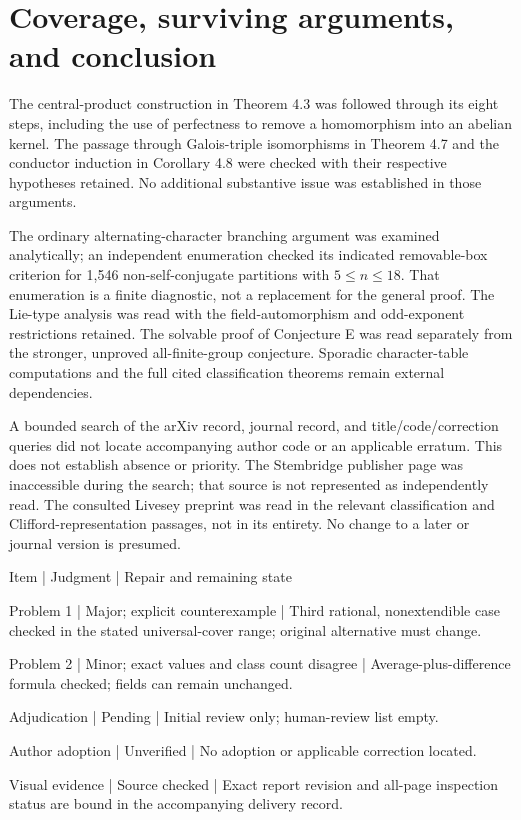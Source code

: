 \documentclass[10pt]{article}
\begin{document}
\section*{Coverage, surviving arguments, and conclusion}
The central-product construction in Theorem 4.3 was followed through its eight steps, including the use of perfectness to remove a homomorphism into an abelian kernel. The passage through Galois-triple isomorphisms in Theorem 4.7 and the conductor induction in Corollary 4.8 were checked with their respective hypotheses retained. No additional substantive issue was established in those arguments.\par
The ordinary alternating-character branching argument was examined analytically; an independent enumeration checked its indicated removable-box criterion for 1,546 non-self-conjugate partitions with \(5\le n\le18\). That enumeration is a finite diagnostic, not a replacement for the general proof. The Lie-type analysis was read with the field-automorphism and odd-exponent restrictions retained. The solvable proof of Conjecture E was read separately from the stronger, unproved all-finite-group conjecture. Sporadic character-table computations and the full cited classification theorems remain external dependencies.\par
A bounded search of the arXiv record, journal record, and title/code/correction queries did not locate accompanying author code or an applicable erratum. This does not establish absence or priority. The Stembridge publisher page was inaccessible during the search; that source is not represented as independently read. The consulted Livesey preprint was read in the relevant classification and Clifford-representation passages, not in its entirety. No change to a later or journal version is presumed.\par
Item | Judgment | Repair and remaining state\par
Problem 1 | Major; explicit counterexample | Third rational, nonextendible case checked in the stated universal-cover range; original alternative must change.\par
Problem 2 | Minor; exact values and class count disagree | Average-plus-difference formula checked; fields can remain unchanged.\par
Adjudication | Pending | Initial review only; human-review list empty.\par
Author adoption | Unverified | No adoption or applicable correction located.\par
Visual evidence | Source checked | Exact report revision and all-page inspection status are bound in the accompanying delivery record.\par
\end{document}
